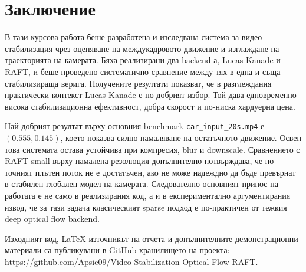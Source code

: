 \documentclass[12pt,a4paper]{article}
\begin{document}
\section{Заключение}
В тази курсова работа беше разработена и изследвана система за видео стабилизация чрез оценяване на междукадровото движение и изглаждане на траекторията на камерата. Бяха реализирани два backend-а, Lucas-Kanade и RAFT, и беше проведено систематично сравнение между тях в една и съща стабилизираща верига. Получените резултати показват, че в разглеждания практически контекст Lucas-Kanade е по-добрият избор. Той дава едновременно висока стабилизационна ефективност, добра скорост и по-ниска хардуерна цена.

Най-добрият резултат върху основния benchmark \texttt{car\_input\_20s.mp4} е \((0.555, 0.145)\), което показва силно намаляване на остатъчното движение. Освен това системата остава устойчива при компресия, blur и downscale. Сравнението с RAFT-small върху намалена резолюция допълнително потвърждава, че по-точният плътен поток не е достатъчен, ако не може надеждно да бъде превърнат в стабилен глобален модел на камерата. Следователно основният принос на работата е не само в реализирания код, а и в експериментално аргументирания извод, че за тази задача класическият sparse подход е по-практичен от тежкия deep optical flow backend.

Изходният код, LaTeX източникът на отчета и допълнителните демонстрационни материали са публикувани в GitHub хранилището на проекта: \url{https://github.com/Apsie09/Video-Stabilization-Optical-Flow-RAFT}.
\end{document}
